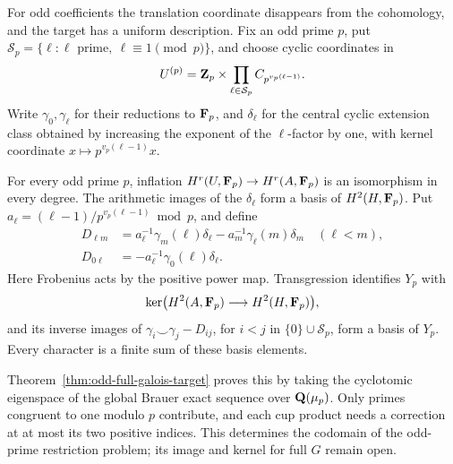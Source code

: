 For odd coefficients the translation coordinate disappears from the
cohomology, and the target has a uniform description. Fix an odd prime
\(p\), put \(\mathcal S_p=\{\ell:\ell\text{ prime},\ \ell\equiv1\pmod p\}\),
and choose cyclic coordinates in
\[
 U^{(p)}=\mathbf Z_p\times\prod_{\ell\in\mathcal S_p}C_{p^{v_p(\ell-1)}}.
\]
Write \(\gamma_0,\gamma_\ell\) for their reductions to \(\mathbf F_p\),
and \(\delta_\ell\) for the central cyclic extension class obtained
by increasing the exponent of the \(\ell\)-factor by one, with
kernel coordinate \(x\mapsto p^{v_p(\ell-1)}x\).

\begin{theorem}\label{thm:main-full-odd-target}
For every odd prime \(p\), inflation
\(H^r(U,\mathbf F_p)\to H^r(A,\mathbf F_p)\) is an isomorphism in every degree.
The arithmetic images of the \(\delta_\ell\) form a basis of
\(H^2(H,\mathbf F_p)\). Put
\(a_\ell=(\ell-1)/p^{v_p(\ell-1)}\bmod p\), and define
\begin{align*}
 D_{\ell m}&=a_\ell^{-1}\gamma_m(\ell)\delta_\ell
                  -a_m^{-1}\gamma_\ell(m)\delta_m\quad(\ell<m),\\
 D_{0\ell}&=-a_\ell^{-1}\gamma_0(\ell)\delta_\ell.
\end{align*}
Here Frobenius acts by the positive power map.
Transgression identifies \(Y_p\) with
\[
 \ker\bigl(H^2(A,\mathbf F_p)\longrightarrow H^2(H,\mathbf F_p)\bigr),
\]
and its inverse images of
\(\gamma_i\smile\gamma_j-D_{ij}\), for
\(i<j\) in \(\{0\}\cup\mathcal S_p\), form a basis of \(Y_p\).
Every character is a finite sum of these basis elements.
\end{theorem}

Theorem~\ref{thm:odd-full-galois-target} proves this by taking the
cyclotomic eigenspace of the global Brauer exact sequence over
\(\mathbf Q(\mu_p)\). Only primes congruent to one modulo \(p\) contribute,
and each cup product needs a correction at at most its two positive
indices. This determines the codomain of the odd-prime restriction
problem; its image and kernel for full \(G\) remain open.
